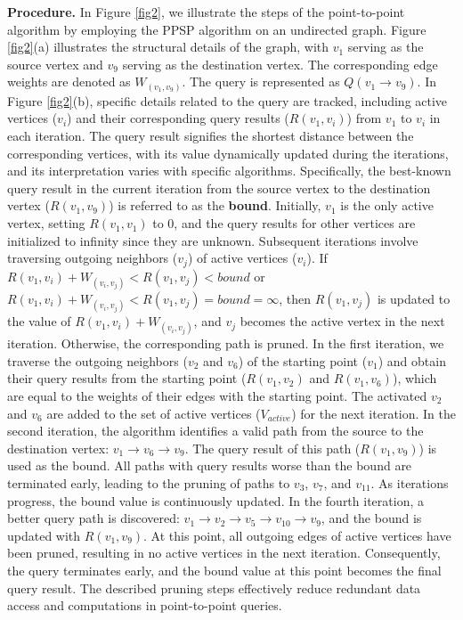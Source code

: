 \documentclass[10pt,journal,compsoc]{IEEEtran}
\begin{document}
{\bf{Procedure.}} In Figure \ref{fig2}, we illustrate the steps of the point-to-point algorithm by employing the PPSP algorithm on an undirected graph.
Figure \ref{fig2}(a) illustrates the structural details of the graph, with $v_1$ serving as the source vertex and $v_9$ serving as the destination vertex. The corresponding edge weights are denoted as $W_{(v_1,v_9)}$. The query is represented as $Q(v_1\rightarrow v_9)$.
In Figure \ref{fig2}(b), specific details related to the query are tracked, including active vertices ($v_i$) and their corresponding query results ($R(v_1,v_i)$) from $v_1$ to $v_i$ in each iteration. The query result signifies the shortest distance between the corresponding vertices, with its value dynamically updated during the iterations, and its interpretation varies with specific algorithms. Specifically, the best-known query result in the current iteration from the source vertex to the destination vertex ($R(v_1,v_9)$) is referred to as the {\bf{bound}}.
Initially, $v_1$ is the only active vertex, setting $R(v_1,v_1)$ to 0, and the query results for other vertices are initialized to infinity since they are unknown. Subsequent iterations involve traversing outgoing neighbors ($v_j$) of active vertices ($v_i$). If $R(v_1,v_i) + W_{(v_i,v_j)} < R(v_1,v_j) < {bound}$ or $R(v_1,v_i) + W_{(v_i,v_j)} < R(v_1,v_j) = {bound} = \infty$, then $R(v_1,v_j)$ is updated to the value of $R(v_1,v_i) + W_{(v_i,v_j)}$, and $v_j$ becomes the active vertex in the next iteration. Otherwise, the corresponding path is pruned.
In the first iteration, we traverse the outgoing neighbors ($v_2$ and $v_6$) of the starting point ($v_1$) and obtain their query results from the starting point ($R(v_1,v_2)$ and $R(v_1,v_6)$), which are equal to the weights of their edges with the starting point. The activated $v_2$ and $v_6$ are added to the set of active vertices ($V_{active}$) for the next iteration.
In the second iteration, the algorithm identifies a valid path from the source to the destination vertex: $v_1\rightarrow v_6\rightarrow v_9$. The query result of this path ($R(v_1,v_9)$) is used as the bound. All paths with query results worse than the bound are terminated early, leading to the pruning of paths to $v_3$, $v_7$, and $v_{11}$. As iterations progress, the bound value is continuously updated.
In the fourth iteration, a better query path is discovered: $v_1\rightarrow v_2\rightarrow v_5\rightarrow v_{10}\rightarrow v_9$, and the bound is updated with $R(v_1,v_9)$. At this point, all outgoing edges of active vertices have been pruned, resulting in no active vertices in the next iteration. Consequently, the query terminates early, and the bound value at this point becomes the final query result. The described pruning steps effectively reduce redundant data access and computations in point-to-point queries.
\end{document}
